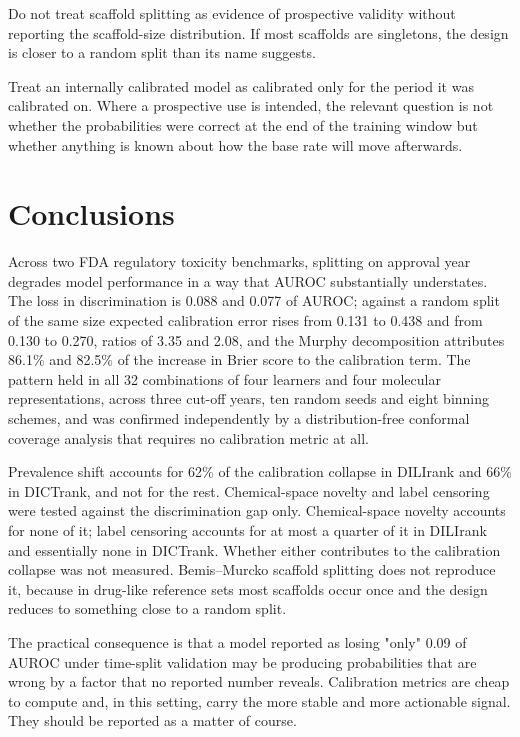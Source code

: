 Do not treat scaffold splitting as evidence of prospective validity without
reporting the scaffold-size distribution. If most scaffolds are singletons, the
design is closer to a random split than its name suggests.

Treat an internally calibrated model as calibrated only for the period it was
calibrated on. Where a prospective use is intended, the relevant question is not
whether the probabilities were correct at the end of the training window but
whether anything is known about how the base rate will move afterwards.

\section{Conclusions}

Across two FDA regulatory toxicity benchmarks, splitting on approval year degrades
model performance in a way that AUROC substantially understates. The loss in
discrimination is 0.088 and 0.077 of AUROC; against a random split of the same size
expected calibration error rises from 0.131 to 0.438 and from 0.130 to 0.270,
ratios of 3.35 and 2.08, and the Murphy decomposition attributes 86.1\% and 82.5\%
of the increase in Brier score to the calibration term. The pattern held in all 32 combinations of four learners and four molecular
representations, across three cut-off years, ten random seeds and eight binning
schemes, and was confirmed independently by a distribution-free conformal coverage
analysis that requires no calibration metric at all.

Prevalence shift accounts for 62\% of the calibration collapse in DILIrank and 66\%
in DICTrank, and not for the rest. Chemical-space novelty and label censoring were tested against the discrimination
gap only. Chemical-space novelty accounts for none of it; label censoring accounts
for at most a quarter of it in DILIrank and essentially none in DICTrank. Whether
either contributes to the calibration collapse was not measured.
Bemis--Murcko scaffold splitting does not reproduce it, because in drug-like
reference sets most scaffolds occur once and the design reduces to something close
to a random split.

The practical consequence is that a model reported as losing "only" 0.09 of AUROC
under time-split validation may be producing probabilities that are wrong by a
factor that no reported number reveals. Calibration metrics are cheap to compute
and, in this setting, carry the more stable and more actionable signal. They should
be reported as a matter of course.
